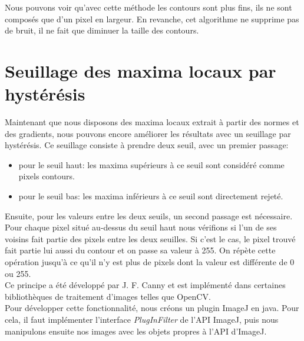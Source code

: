 \documentclass[a4paper,11pt]{article}
\begin{document}
  Nous pouvons voir qu'avec cette méthode les contours sont plus fins, ils ne sont composés que d'un pixel en largeur. 
  En revanche, cet algorithme ne supprime pas de bruit, il ne fait que diminuer la taille des contours.
  
  \section{Seuillage des maxima locaux par hystérésis}
  
  Maintenant que nous disposons des maxima locaux extrait à partir des normes et des gradients, nous 
  pouvons encore améliorer les résultats avec un seuillage par hystérésis. Ce seuillage consiste à prendre 
  deux seuil, avec un premier passage:
  \begin{itemize}
   \item pour le seuil haut: les maxima supérieurs à ce seuil sont considéré comme pixels contours.
   \item pour le seuil bas: les maxima inférieurs à ce seuil sont directement rejeté.
  \end{itemize}
  
  Ensuite, pour les valeurs entre les deux seuils, un second passage est nécessaire. Pour chaque
  pixel situé au-dessus du seuil haut nous vérifions si l'un de ses voisins fait partie des pixels entre les deux seuilles.
  Si c'est le cas, le pixel trouvé fait partie lui aussi du contour et on passe sa valeur à 255. On répète cette opération
  jusqu'à ce qu'il n'y est plus de pixels dont la valeur est différente de 0 ou 255.\\

  Ce principe a été développé par J. F. Canny et est implémenté dans certaines bibliothèques de
  traitement d'images telles que OpenCV.\\

  Pour développer cette fonctionnalité, nous créons un plugin ImageJ en java. Pour cela, il faut
  implémenter l'interface \textit{PlugInFilter} de l'API ImageJ, puis nous manipulons ensuite nos
  images avec les objets propres à l'API d'ImageJ.\\
 
\end{document}

